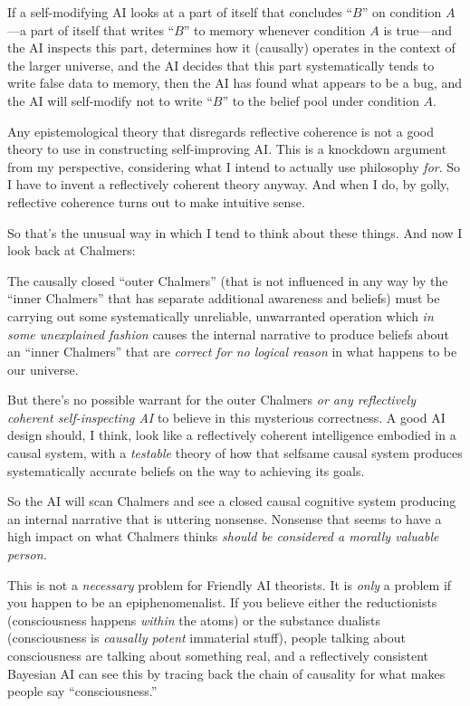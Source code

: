{
 If a self-modifying AI looks at a part of itself that concludes
``$B$'' on condition $A$---a part of
itself that writes ``$B$'' to memory
whenever condition $A$ is true---and the AI inspects this part,
determines how it (causally) operates in the context of the larger
universe, and the AI decides that this part systematically tends to
write false data to memory, then the AI has found what appears to be a
bug, and the AI will self-modify not to write
``$B$'' to the belief pool under
condition $A$.}

{
 Any epistemological theory that disregards reflective coherence is
not a good theory to use in constructing self-improving AI. This is a
knockdown argument from my perspective, considering what I intend to
actually use philosophy \textit{for}. So I have to invent a
reflectively coherent theory anyway. And when I do, by golly,
reflective coherence turns out to make intuitive sense.}

{
 So that's the unusual way in which I tend to think
about these things. And now I look back at Chalmers:}

{
 The causally closed ``outer
Chalmers'' (that is not influenced in any way by the
``inner Chalmers'' that has separate
additional awareness and beliefs) must be carrying out some
systematically unreliable, unwarranted operation which \textit{in some
unexplained fashion} causes the internal narrative to produce beliefs
about an ``inner Chalmers'' that are
\textit{correct for no logical reason} in what happens to be our
universe.}

{
 But there's no possible warrant for the outer
Chalmers \textit{or any reflectively coherent self-inspecting AI} to
believe in this mysterious correctness. A good AI design should, I
think, look like a reflectively coherent intelligence embodied in a
causal system, with a \textit{testable} theory of how that selfsame
causal system produces systematically accurate beliefs on the way to
achieving its goals.}

{
 So the AI will scan Chalmers and see a closed causal cognitive
system producing an internal narrative that is uttering nonsense.
Nonsense that seems to have a high impact on what Chalmers thinks
\textit{should be considered a morally valuable person.}}

{
 This is not a \textit{necessary} problem for Friendly AI
theorists. It is \textit{only} a problem if you happen to be an
epiphenomenalist. If you believe either the reductionists
(consciousness happens \textit{within} the atoms) or the substance
dualists (consciousness is \textit{causally potent} immaterial stuff),
people talking about consciousness are talking about something real,
and a reflectively consistent Bayesian AI can see this by tracing back
the chain of causality for what makes people say
``consciousness.''}

